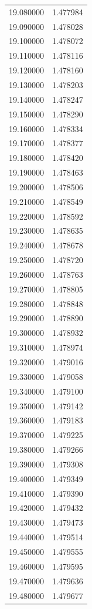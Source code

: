 \begin{tabular}{rr}
19.080000 & 1.477984 \\
19.090000 & 1.478028 \\
19.100000 & 1.478072 \\
19.110000 & 1.478116 \\
19.120000 & 1.478160 \\
19.130000 & 1.478203 \\
19.140000 & 1.478247 \\
19.150000 & 1.478290 \\
19.160000 & 1.478334 \\
19.170000 & 1.478377 \\
19.180000 & 1.478420 \\
19.190000 & 1.478463 \\
19.200000 & 1.478506 \\
19.210000 & 1.478549 \\
19.220000 & 1.478592 \\
19.230000 & 1.478635 \\
19.240000 & 1.478678 \\
19.250000 & 1.478720 \\
19.260000 & 1.478763 \\
19.270000 & 1.478805 \\
19.280000 & 1.478848 \\
19.290000 & 1.478890 \\
19.300000 & 1.478932 \\
19.310000 & 1.478974 \\
19.320000 & 1.479016 \\
19.330000 & 1.479058 \\
19.340000 & 1.479100 \\
19.350000 & 1.479142 \\
19.360000 & 1.479183 \\
19.370000 & 1.479225 \\
19.380000 & 1.479266 \\
19.390000 & 1.479308 \\
19.400000 & 1.479349 \\
19.410000 & 1.479390 \\
19.420000 & 1.479432 \\
19.430000 & 1.479473 \\
19.440000 & 1.479514 \\
19.450000 & 1.479555 \\
19.460000 & 1.479595 \\
19.470000 & 1.479636 \\
19.480000 & 1.479677 \\

\end{tabular}
